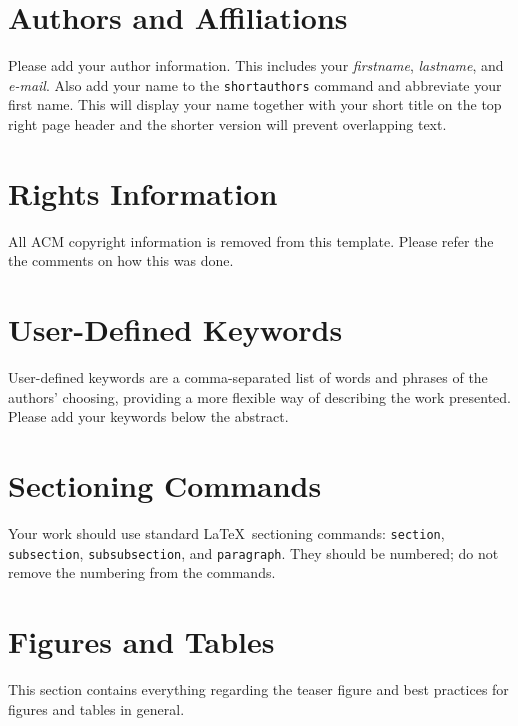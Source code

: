 \documentclass[sigchi]{acmart}
\begin{document}
\section{Authors and Affiliations}
Please add your author information. This includes your
\emph{firstname}, \emph{lastname}, and \emph{e-mail}. Also add your name to the 
\verb|shortauthors| command and abbreviate your first name. This will display your name together with your short title on the top right page header and the shorter version will prevent overlapping text.

\section{Rights Information}
All ACM copyright information is removed from this template. Please refer the the comments on how this was done.

\section{User-Defined Keywords}
User-defined keywords are a comma-separated list of words and phrases
of the authors' choosing, providing a more flexible way of describing
the work presented. Please add your keywords below the abstract.

\section{Sectioning Commands}
Your work should use standard \LaTeX\ sectioning commands:
\verb|section|, \verb|subsection|, \verb|subsubsection|, and
\verb|paragraph|. They should be numbered; do not remove the numbering
from the commands.

\section{Figures and Tables}
This section contains everything regarding the teaser figure and best practices for figures and tables in general.
\end{document}

